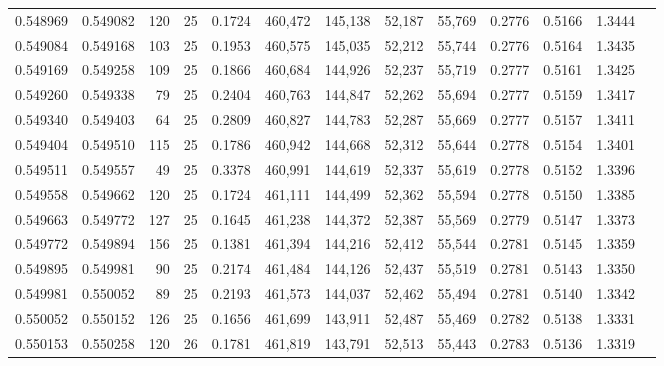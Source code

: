 \begin{tabular}{rrrrrrrrrrrrr}
0.548969 & 0.549082 &   120 &  25 &                                     0.1724 & 460,472 & 145,138 &  52,187 &  55,769 & 0.2776 & 0.5166 & 1.3444 \\
0.549084 & 0.549168 &   103 &  25 &                                     0.1953 & 460,575 & 145,035 &  52,212 &  55,744 & 0.2776 & 0.5164 & 1.3435 \\
0.549169 & 0.549258 &   109 &  25 &                                     0.1866 & 460,684 & 144,926 &  52,237 &  55,719 & 0.2777 & 0.5161 & 1.3425 \\
0.549260 & 0.549338 &    79 &  25 &                                     0.2404 & 460,763 & 144,847 &  52,262 &  55,694 & 0.2777 & 0.5159 & 1.3417 \\
0.549340 & 0.549403 &    64 &  25 &                                     0.2809 & 460,827 & 144,783 &  52,287 &  55,669 & 0.2777 & 0.5157 & 1.3411 \\
0.549404 & 0.549510 &   115 &  25 &                                     0.1786 & 460,942 & 144,668 &  52,312 &  55,644 & 0.2778 & 0.5154 & 1.3401 \\
0.549511 & 0.549557 &    49 &  25 &                                     0.3378 & 460,991 & 144,619 &  52,337 &  55,619 & 0.2778 & 0.5152 & 1.3396 \\
0.549558 & 0.549662 &   120 &  25 &                                     0.1724 & 461,111 & 144,499 &  52,362 &  55,594 & 0.2778 & 0.5150 & 1.3385 \\
0.549663 & 0.549772 &   127 &  25 &                                     0.1645 & 461,238 & 144,372 &  52,387 &  55,569 & 0.2779 & 0.5147 & 1.3373 \\
0.549772 & 0.549894 &   156 &  25 &                                     0.1381 & 461,394 & 144,216 &  52,412 &  55,544 & 0.2781 & 0.5145 & 1.3359 \\
0.549895 & 0.549981 &    90 &  25 &                                     0.2174 & 461,484 & 144,126 &  52,437 &  55,519 & 0.2781 & 0.5143 & 1.3350 \\
0.549981 & 0.550052 &    89 &  25 &                                     0.2193 & 461,573 & 144,037 &  52,462 &  55,494 & 0.2781 & 0.5140 & 1.3342 \\
0.550052 & 0.550152 &   126 &  25 &                                     0.1656 & 461,699 & 143,911 &  52,487 &  55,469 & 0.2782 & 0.5138 & 1.3331 \\
0.550153 & 0.550258 &   120 &  26 &                                     0.1781 & 461,819 & 143,791 &  52,513 &  55,443 & 0.2783 & 0.5136 & 1.3319 \\

\end{tabular}
